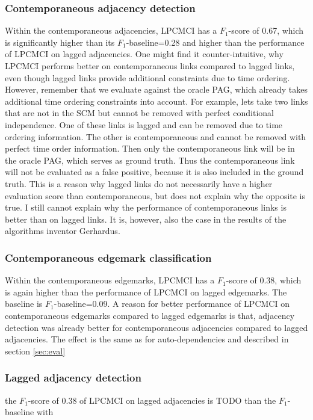 \documentclass[conference]{IEEEtran}
\begin{document}
\subsubsection{Contemporaneous adjacency detection}
Within the contemporaneous adjacencies, LPCMCI has a $F_1$-score of 0.67, which is significantly higher than its $F_1$-baseline=0.28 and higher than the performance of LPCMCI on lagged adjacencies.
One might find it counter-intuitive, why LPCMCI performs better on contemporaneous links compared to lagged links, even though lagged links provide additional constraints due to time ordering. However, remember that we evaluate against the oracle PAG, which already takes additional time ordering constraints into account. For example, lets take two links that are not in the SCM but cannot be removed with perfect conditional independence. One of these links is lagged and can be removed due to time ordering information. The other is contemporaneous and cannot be removed with perfect time order information. Then only the contemporaneous link will be in the oracle PAG, which serves as ground truth. Thus the contemporaneous link will not be evaluated as a false positive, because it is also included in the ground truth. This is a reason why lagged links do not necessarily have a higher evaluation score than contemporaneous, but does not explain why the opposite is true.
I still cannot explain why the performance of contemporaneous links is better than on lagged links.
It is, however, also the case in the results of the algorithms inventor Gerhardus\cite{gerhardus_high-recall_2021}.

\subsubsection{Contemporaneous edgemark classification}
Within the contemporaneous edgemarks, LPCMCI has a $F_1$-score of 0.38, which is again higher than the performance of LPCMCI on lagged edgemarks. The baseline is $F_1$-baseline=0.09.
A reason for better performance of LPCMCI on contemporaneous edgemarks compared to lagged edgemarks is that, adjacency detection was already better for contemporaneous adjacencies compared to lagged adjacencies. The effect is the same as for auto-dependencies and described in section \ref{sec:eval}

\subsubsection{Lagged adjacency detection}
the $F_1$-score of 0.38 of LPCMCI on lagged adjacencies is TODO than the $F_1$-baseline with 
\end{document}
